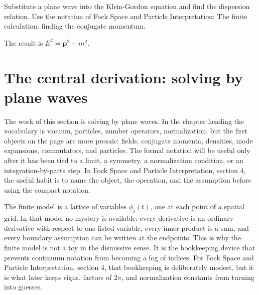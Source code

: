 \begin{exercise}
Substitute a plane wave into the Klein-Gordon equation and find the dispersion relation.  Use the notation of Fock Space and Particle Interpretation: The finite calculation: finding the conjugate momentum.
\begin{answer}
The result is \(E^2=\bm p^2+m^2\).
\end{answer}
\end{exercise}



\section{The central derivation: solving by plane waves}













The work of this section is solving by plane waves.  In the chapter heading the vocabulary is vacuum, particles, number operators, normalization, but the first objects on the page are more prosaic: fields, conjugate momenta, densities, mode expansions, commutators, and particles.  The formal notation will be useful only after it has been tied to a limit, a symmetry, a normalization condition, or an integration-by-parts step.  In Fock Space and Particle Interpretation, section 4, the useful habit is to name the object, the operation, and the assumption before using the compact notation.

The finite model is a lattice of variables \(\phi_j(t)\), one at each point of a spatial grid.  In that model no mystery is available: every derivative is an ordinary derivative with respect to one listed variable, every inner product is a sum, and every boundary assumption can be written at the endpoints.  This is why the finite model is not a toy in the dismissive sense.  It is the bookkeeping device that prevents continuum notation from becoming a fog of indices.  For Fock Space and Particle Interpretation, section 4, that bookkeeping is deliberately modest, but it is what later keeps signs, factors of \(2\pi\), and normalization constants from turning into guesses.

